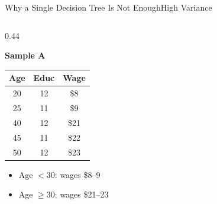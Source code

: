 \documentclass[hyperref={pdfpagelabels=false}]{beamer}
\begin{document}
\begin{frame}{Why a Single Decision Tree Is Not Enough}{High Variance}
\begin{columns}[T]

\begin{column}{0.44\textwidth}
  \begin{center}\textbf{Sample A}\end{center}
  \begin{center}\small
  \begin{tabular}{@{}ccc@{}}
    \toprule
    Age & Educ & Wage \\
    \midrule
    20 & 12 & \$8  \\
    25 & 11 & \$9  \\
    40 & 12 & \$21 \\
    45 & 11 & \$22 \\
    50 & 12 & \$23 \\
    \bottomrule
  \end{tabular}
  \end{center}
  \begin{itemize}\small
    \item Age $<30$: wages \$8--9
          \vspace{0.1cm}

    \item Age $\geq30$: wages \$21--23


\end{itemize}
\end{column}
\end{columns}
\end{frame}
\end{document}
